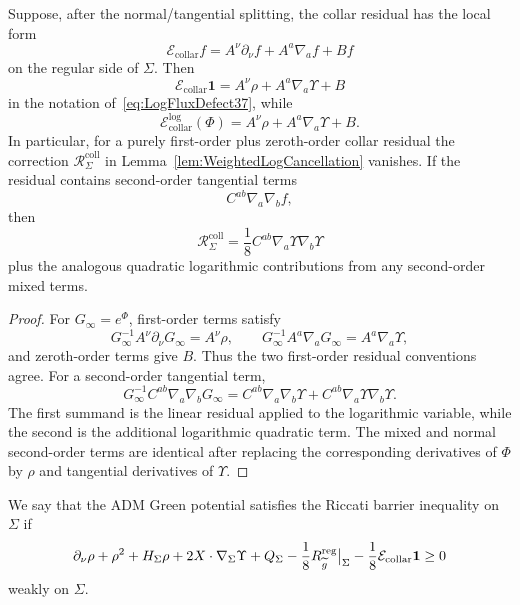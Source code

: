 \begin{lemma}\label{lem:CollarResidualBookkeeping37}
Suppose, after the normal/tangential splitting, the collar residual has the local form
\[
    \mathcal E_{\mathrm{collar}}f
    =
    A^\nu\partial_\nu f
    +A^a\nabla_a f
    +Bf
\]
on the regular side of \(\Sigma\). Then
\[
    \mathcal E_{\mathrm{collar}}\mathbf 1
    =
    A^\nu\rho+A^a\nabla_a\Upsilon+B
\]
in the notation of~\eqref{eq:LogFluxDefect37}, while
\[
    \mathcal E_{\mathrm{collar}}^{\log}(\Phi)
    =
    A^\nu\rho+A^a\nabla_a\Upsilon+B .
\]
In particular, for a purely first-order plus zeroth-order collar residual the correction
\(\mathcal R_\Sigma^{\mathrm{coll}}\) in Lemma~\ref{lem:WeightedLogCancellation} vanishes. If the residual contains second-order tangential terms
\[
    C^{ab}\nabla_a\nabla_b f,
\]
then
\[
    \mathcal R_\Sigma^{\mathrm{coll}}
    =
    \frac18 C^{ab}\nabla_a\Upsilon\nabla_b\Upsilon
\]
plus the analogous quadratic logarithmic contributions from any second-order mixed terms.
\end{lemma}

\begin{proof}
For \(G_\infty=e^\Phi\), first-order terms satisfy
\[
    G_\infty^{-1}A^\nu\partial_\nu G_\infty=A^\nu\rho,\qquad
    G_\infty^{-1}A^a\nabla_aG_\infty=A^a\nabla_a\Upsilon,
\]
and zeroth-order terms give \(B\). Thus the two first-order residual conventions agree. For a second-order tangential term,
\[
    G_\infty^{-1}C^{ab}\nabla_a\nabla_bG_\infty
    =
    C^{ab}\nabla_a\nabla_b\Upsilon
    +C^{ab}\nabla_a\Upsilon\nabla_b\Upsilon .
\]
The first summand is the linear residual applied to the logarithmic variable, while the second is the additional logarithmic quadratic term. The mixed and normal second-order terms are identical after replacing the corresponding derivatives of \(\Phi\) by \(\rho\) and tangential derivatives of \(\Upsilon\).
\end{proof}

\begin{definition}\label{def:RiccatiBarrier37}
We say that the ADM Green potential satisfies the Riccati barrier inequality on \(\Sigma\) if
\begin{equation}\label{eq:RiccatiBarrier37}
    \partial_\nu\rho+\rho^2+H_\Sigma\rho
    +2X\cdot\nabla_\Sigma\Upsilon
    +Q_\Sigma-\frac18 R_{\widetilde{g}}^{\mathrm{reg}}\big|_\Sigma
    -\frac18\mathcal E_{\mathrm{collar}}\mathbf 1
    \ge0
\end{equation}
weakly on \(\Sigma\).
\end{definition}

